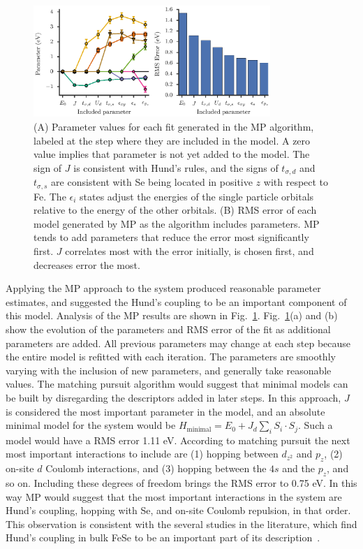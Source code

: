 \begin{figure}
  \centering
  \includegraphics[width=0.8\textwidth]{./Figures/fese.eps}
  \caption{
    \label{fig:fese} 
    (A) Parameter values for each fit generated in the MP algorithm, labeled at the step where they are included in the model. 
    A zero value implies that parameter is not yet added to the model.
    The sign of $J$ is consistent with Hund's rules, and the signs of $t_{\sigma,d}$ and $t_{\sigma,s}$ are consistent with Se being located in positive $z$ with respect to Fe. 
    The $\epsilon_i$ states adjust the energies of the single particle orbitals relative to the energy of the other orbitals.
    (B) RMS error of each model generated by MP as the algorithm includes parameters. 
    MP tends to add parameters that reduce the error most significantly first. 
    $J$ correlates most with the error initially, is chosen first, and decreases error the most.
  }
\end{figure}

Applying the MP approach to the system produced reasonable parameter estimates, and suggested the Hund's coupling to be an important component of this model.
Analysis of the MP results are shown in Fig.~\ref{fig:fese}. 
Fig.~\ref{fig:fese}(a) and (b) show the evolution of the parameters and RMS error of the fit as additional parameters are added.
All previous parameters may change at each step because the entire model is refitted with each iteration.
The parameters are smoothly varying with the inclusion of new parameters, and generally take reasonable values.
The matching pursuit algorithm would suggest that minimal models can be built by disregarding the descriptors added in later steps.
In this approach, $J$ is considered the most important parameter in the model, and an absolute minimal model for the system would be $H_\text{minimal} = E_0 + J_d \sum_i S_i \cdot S_j$. 
Such a model would have a RMS error 1.11 eV. 
According to matching pursuit the next most important interactions to include are (1) hopping between $d_{z^2}$ and $p_z$, (2) on-site $d$ Coulomb interactions, and (3) hopping between the $4s$ and the $p_z$, and so on. 
Including these degrees of freedom brings the RMS error to 0.75 eV.
In this way MP would suggest that the most important interactions in the system are Hund's coupling, hopping with Se, and on-site Coulomb repulsion, in that order.
This observation is consistent with the several studies in the literature, which find Hund's coupling in bulk FeSe to be an important part of its description~\cite{demedici_hunds_2011,de_medici_janus-faced_2011,georges_strong_2013,busemeyer_competing_2016}.
